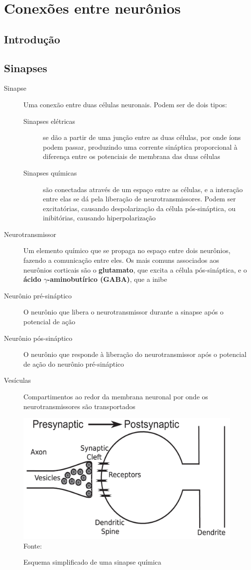 \chapter{Conexões entre neurônios}\label{cap:conexoes}
\section{Introdução}\label{sec:conexoes_intro}

\section{Sinapses}\label{sec:sinapses}
\begin{description}
	\item[Sinapse] Uma conexão entre duas células neuronais. Podem ser de dois tipos:
	\begin{description}
		\item[Sinapses elétricas] se dão a partir de uma junção entre as duas células, por onde íons podem passar, produzindo uma corrente sináptica proporcional à diferença entre os potenciais de membrana das duas células
		\item[Sinapses químicas] são conectadas através de um espaço entre as células, e a interação entre elas se dá pela liberação de neurotransmissores. Podem ser excitatórias, causando despolarização da célula pós-sináptica, ou inibitórias, causando hiperpolarização
	\end{description}
	\item[Neurotransmissor] Um elemento químico que se propaga no espaço entre dois neurônios, fazendo a comunicação entre eles. Os mais comuns associados aos neurônios corticais são o \textbf{glutamato}, que excita a célula pós-sináptica, e o \textbf{ácido $\gamma$-aminobutírico (GABA)}, que a inibe
	\item[Neurônio pré-sináptico] O neurônio que libera o neurotransmissor durante a sinapse após o potencial de ação
	\item[Neurônio pós-sináptico] O neurônio que responde à liberação do neurotransmissor após o potencial de ação do neurônio pré-sináptico
	\item[Vesículas] Compartimentos ao redor da membrana neuronal por onde os neurotransmissores são transportados
\end{description}

\begin{figure}[htb!]
	\centering
	\caption{Esquema simplificado de uma sinapse química}
	\label{fig:sinapses}
	\includegraphics[width=0.7\linewidth]{figs/sinapses}
	\small{Fonte: \cite{miller_introductory_2018}}
\end{figure}


